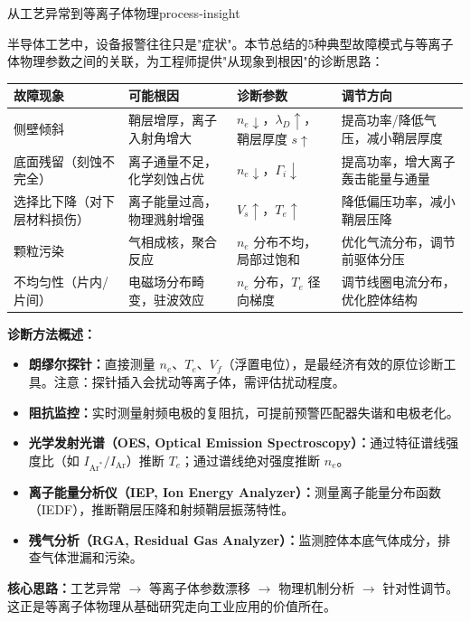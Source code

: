 \documentclass[12pt,a4paper,openany,oneside]{book}
\begin{document}
\begin{insight}{从工艺异常到等离子体物理}{process-insight}

半导体工艺中，设备报警往往只是"症状"。本节总结的5种典型故障模式与等离子体物理参数之间的关联，为工程师提供"从现象到根因"的诊断思路：

\begin{center}
\small
\setlength{\tabcolsep}{4pt}
\begin{tabular}{@{}p{3.2cm}p{3.5cm}p{3.5cm}p{3.5cm}@{}}
\toprule
\textbf{故障现象} & \textbf{可能根因} & \textbf{诊断参数} & \textbf{调节方向} \\
\midrule
侧壁倾斜 & 鞘层增厚，离子入射角增大 & $n_e \downarrow$，$\lambda_D \uparrow$，鞘层厚度 $s \uparrow$ & 提高功率/降低气压，减小鞘层厚度 \\
底面残留（刻蚀不完全） & 离子通量不足，化学刻蚀占优 & $n_e \downarrow$，$\Gamma_i \downarrow$ & 提高功率，增大离子轰击能量与通量 \\
选择比下降（对下层材料损伤） & 离子能量过高，物理溅射增强 & $V_s \uparrow$，$T_e \uparrow$ & 降低偏压功率，减小鞘层压降 \\
颗粒污染 & 气相成核，聚合反应 & $n_e$ 分布不均，局部过饱和 & 优化气流分布，调节前驱体分压 \\
不均匀性（片内/片间） & 电磁场分布畸变，驻波效应 & $n_e$ 分布，$T_e$ 径向梯度 & 调节线圈电流分布，优化腔体结构 \\
\bottomrule
\end{tabular}
\end{center}

\textbf{诊断方法概述：}

\begin{itemize}
    \item \textbf{朗缪尔探针：}直接测量 $n_e$、$T_e$、$V_f$（浮置电位），是最经济有效的原位诊断工具。注意：探针插入会扰动等离子体，需评估扰动程度。
    \item \textbf{阻抗监控：}实时测量射频电极的复阻抗，可提前预警匹配器失谐和电极老化。
    \item \textbf{光学发射光谱（OES, Optical Emission Spectroscopy）：}通过特征谱线强度比（如 $I_{\text{Ar}^{*}}/I_{\text{Ar}}$）推断 $T_e$；通过谱线绝对强度推断 $n_e$。
    \item \textbf{离子能量分析仪（IEP, Ion Energy Analyzer）：}测量离子能量分布函数（IEDF），推断鞘层压降和射频鞘层振荡特性。
    \item \textbf{残气分析（RGA, Residual Gas Analyzer）：}监测腔体本底气体成分，排查气体泄漏和污染。
\end{itemize}

\textbf{核心思路：}工艺异常 $\rightarrow$ 等离子体参数漂移 $\rightarrow$ 物理机制分析 $\rightarrow$ 针对性调节。这正是等离子体物理从基础研究走向工业应用的价值所在。
\end{insight}
\end{document}
